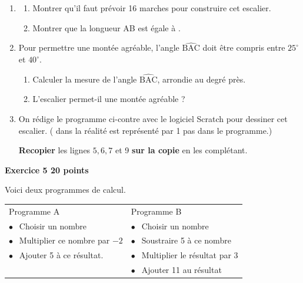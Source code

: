 \documentclass[11pt]{article}
\begin{document}
\begin{enumerate}
	\item \begin{enumerate}
		\item Montrer qu'il faut prévoir 16 marches pour construire cet escalier.
		\item Montrer que la longueur AB est égale à .
	\end{enumerate}
	\item Pour permettre une montée agréable, l'angle $\widehat{\mathrm{BAC}}$ doit être compris entre $25^{\circ}$ et $40^{\circ}$.
	\begin{enumerate}
		\item Calculer la mesure de l'angle $\widehat{\mathrm{BAC}}$, arrondie au degré près.
		\item L'escalier permet-il une montée agréable ?
	\end{enumerate}
	\item \begin{minipage}[t]{7.5cm}
		On rédige le programme ci-contre avec le logiciel Scratch pour dessiner cet escalier.
	( dans la réalité est représenté par 1 pas dans le programme.)

	\textbf{Recopier} les lignes $5,6,7$ et 9 \textbf{sur la copie} en les complétant.
	\end{minipage}\hfill
	\begin{scratch}
	\end{scratch}
\end{enumerate}

\newpage

\textbf{Exercice 5 \hfill 20 points}

\medskip

Voici deux programmes de calcul.

\begin{center}
	\begin{tabularx}{\linewidth}{|X|X|}\hline
Programme A &Programme B\\
$\bullet~~$ Choisir un nombre				&$\bullet~~$ Choisir un nombre\\
$\bullet~~$ Multiplier ce nombre par $-2$	&$\bullet~~$ Soustraire 5 à ce nombre\\
$\bullet~~$ Ajouter 5 à ce résultat.		&$\bullet~~$ Multiplier le résultat par 3\\
											&$\bullet~~$ Ajouter 11 au résultat\\ \hline
	\end{tabularx}
\end{center}
\end{document}

